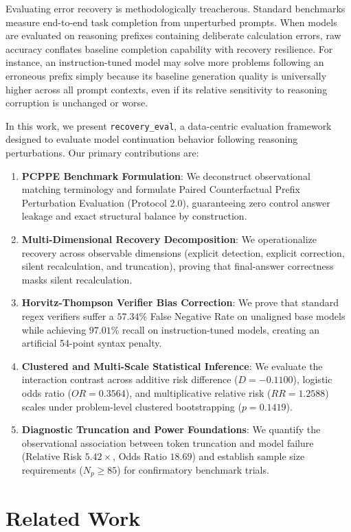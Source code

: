 \documentclass[conference]{IEEEtran}
\begin{document}
Evaluating error recovery is methodologically treacherous. Standard benchmarks measure end-to-end task completion from unperturbed prompts. When models are evaluated on reasoning prefixes containing deliberate calculation errors, raw accuracy conflates baseline completion capability with recovery resilience. For instance, an instruction-tuned model may solve more problems following an erroneous prefix simply because its baseline generation quality is universally higher across all prompt contexts, even if its relative sensitivity to reasoning corruption is unchanged or worse.

In this work, we present \texttt{recovery\_eval}, a data-centric evaluation framework designed to evaluate model continuation behavior following reasoning perturbations. Our primary contributions are:
\begin{enumerate}
    \item \textbf{PCPPE Benchmark Formulation}: We deconstruct observational matching terminology and formulate Paired Counterfactual Prefix Perturbation Evaluation (Protocol 2.0), guaranteeing zero control answer leakage and exact structural balance by construction.
    \item \textbf{Multi-Dimensional Recovery Decomposition}: We operationalize recovery across observable dimensions (explicit detection, explicit correction, silent recalculation, and truncation), proving that final-answer correctness masks silent recalculation.
    \item \textbf{Horvitz-Thompson Verifier Bias Correction}: We prove that standard regex verifiers suffer a $57.34\%$ False Negative Rate on unaligned base models while achieving $97.01\%$ recall on instruction-tuned models, creating an artificial 54-point syntax penalty.
    \item \textbf{Clustered and Multi-Scale Statistical Inference}: We evaluate the interaction contrast across additive risk difference ($D = -0.1100$), logistic odds ratio ($OR = 0.3564$), and multiplicative relative risk ($RR = 1.2588$) scales under problem-level clustered bootstrapping ($p = 0.1419$).
    \item \textbf{Diagnostic Truncation and Power Foundations}: We quantify the observational association between token truncation and model failure (Relative Risk $5.42\times$, Odds Ratio $18.69$) and establish sample size requirements ($N_p \ge 85$) for confirmatory benchmark trials.
\end{enumerate}

\section{Related Work}
\end{document}
